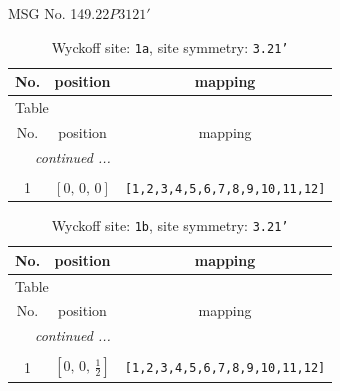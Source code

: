 \documentclass[fleqn,8pt]{jsarticle}
\begin{document}
\setcounter{MaxMatrixCols}{32}

\renewcommand{\tablename}{Table~}
\renewcommand{\figurename}{Figure~}
\begin{center}
\LARGE
MSG No. 149.22\quad$P3121'$
\end{center}
\renewcommand{\arraystretch}{1.2}
\begin{longtable}{ccc}
\caption{Wyckoff site: {\tt 1a}, site symmetry: {\tt 3.21'}}
 \\
 \hline \hline
No. & position & mapping \\ \hline \endfirsthead

\multicolumn{2}{l}{\tablename\ \thetable{}} \\
 \hline \hline
No. & position & mapping \\ \hline \endhead

 \hline \hline
\multicolumn{2}{r}{\footnotesize\it continued ...} \\ \endfoot

 \hline \hline
\multicolumn{2}{r}{} \\ \endlastfoot

1 & $\left[ 0,\, 0,\, 0 \right]$ & {\tt [1,2,3,4,5,6,7,8,9,10,11,12]} \\
\end{longtable}
\renewcommand{\arraystretch}{1.2}
\begin{longtable}{ccc}
\caption{Wyckoff site: {\tt 1b}, site symmetry: {\tt 3.21'}}
 \\
 \hline \hline
No. & position & mapping \\ \hline \endfirsthead

\multicolumn{2}{l}{\tablename\ \thetable{}} \\
 \hline \hline
No. & position & mapping \\ \hline \endhead

 \hline \hline
\multicolumn{2}{r}{\footnotesize\it continued ...} \\ \endfoot

 \hline \hline
\multicolumn{2}{r}{} \\ \endlastfoot

1 & $\left[ 0,\, 0,\, \frac{1}{2} \right]$ & {\tt [1,2,3,4,5,6,7,8,9,10,11,12]} \\
\end{longtable}
\renewcommand{\arraystretch}{1.2}
\end{document}
